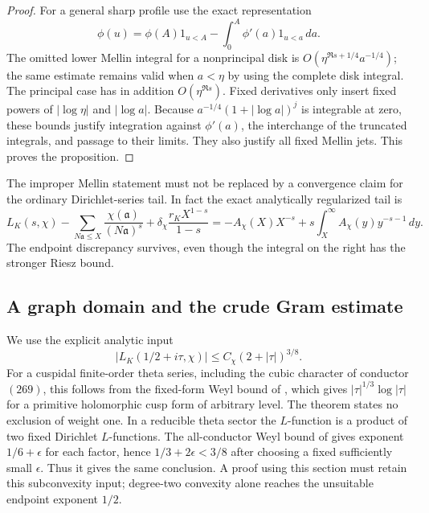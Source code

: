 \begin{proof}
For a general sharp profile use the exact representation
\[
 \phi(u)=\phi(A)1_{u<A}
                -\int_0^A\phi'(a)1_{u<a}\,da.
\]
The omitted lower Mellin integral for a nonprincipal disk is
$O(\eta^{\Re s+1/4}a^{-1/4})$; the same estimate remains valid
when $a<\eta$ by using the complete disk integral.  The principal
case has in addition $O(\eta^{\Re s})$.  Fixed derivatives only
insert fixed powers of $|\log\eta|$ and $|\log a|$.
Because $a^{-1/4}(1+|\log a|)^j$ is integrable at zero, these bounds
justify integration against $\phi'(a)$, the interchange of the
truncated integrals, and passage to their limits.  They also justify
all fixed Mellin jets.  This proves the proposition.
\end{proof}

The improper Mellin statement must not be replaced by a convergence
claim for the ordinary Dirichlet-series tail.  In fact the exact
analytically regularized tail is
\begin{equation}\label{eq:hecke-tail-endpoint}
 L_K(s,\chi)-\sum_{N\mathfrak a\leq X}
    \frac{\chi(\mathfrak a)}{(N\mathfrak a)^s}
 +\delta_\chi\frac{r_KX^{1-s}}{1-s}
 =-A_\chi(X)X^{-s}
           +s\int_X^\infty A_\chi(y)y^{-s-1}\,dy.
\end{equation}
The endpoint discrepancy survives, even though the integral on the
right has the stronger Riesz bound.

\subsection{A graph domain and the crude Gram estimate}

We use the explicit analytic input
\begin{equation}\label{eq:hecke-subconvex-input}
 |L_K(1/2+i\tau,\chi)|\leq C_\chi(2+|\tau|)^{3/8}.
\end{equation}
For a cuspidal finite-order theta series, including the cubic
character of conductor $(269)$, this follows from the fixed-form
Weyl bound of \citet[Theorem~1.1, p.~2]{booker2019}, which gives
$|\tau|^{1/3}\log|\tau|$ for a primitive holomorphic cusp form of
arbitrary level.  The theorem states no exclusion of weight one.
In a reducible theta sector the $L$-function is a product of two
fixed Dirichlet $L$-functions.  The all-conductor Weyl bound of
\citet[Theorem~1.1, p.~1]{petrowyoung2023} gives exponent
$1/6+\epsilon$ for each factor, hence $1/3+2\epsilon<3/8$
after choosing a fixed sufficiently small $\epsilon$.
Thus it gives the same conclusion.  A proof using this section must retain
this subconvexity input; degree-two convexity alone reaches the
unsuitable endpoint exponent $1/2$.

